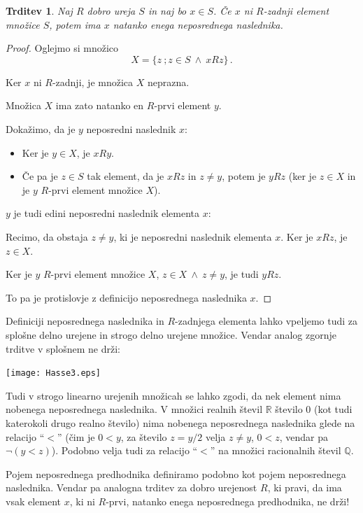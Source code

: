 \documentclass[11pt,paper=b5,footinclude,headinclude]{scrbook} %
\def\inn {{~\wedge~}}
\newtheorem*{trditev}{Trditev}
\begin{document}
\begin{trditev}
Naj $R$ dobro ureja $S$ in naj bo $x\in S$. Če $x$ ni $R$-zadnji element množice $S$, potem ima $x$ natanko enega neposrednega naslednika.
\end{trditev}

\begin{proof}
Oglejmo si množico
$$X = \{z~;z\in S\inn xRz\}\,.$$

Ker $x$ ni $R$-zadnji, je množica $X$ neprazna.

Množica $X$ ima zato natanko en $R$-prvi element $y$.

Dokažimo, da je $y$ neposredni naslednik $x$:
\begin{itemize}
  \item Ker je $y\in X$, je $xRy$.
  \item Če pa je $z\in S$ tak element, da je $xRz$ in $z\neq y$, potem je
$yRz$ (ker je $z\in X$ in je $y$ $R$-prvi element množice $X$).
\end{itemize}

$y$ je tudi edini neposredni naslednik elementa $x$:

Recimo, da obstaja $z\neq y$, ki je neposredni naslednik elementa $x$.
Ker je $xRz$, je $z\in X$.

Ker je $y$ $R$-prvi element množice $X$, $z\in X\inn z\neq y$,
je tudi $yRz$.

To pa je protislovje z definicijo neposrednega naslednika $x$.
\end{proof}

Definiciji neposrednega naslednika in $R$-zadnjega elementa lahko vpeljemo tudi za splošne delno urejene in strogo delno urejene množice. Vendar analog zgornje trditve v splošnem ne drži:

\begin{center}
\texttt{[image: Hasse3.eps]}
\end{center}

Tudi v strogo linearno urejenih množicah se lahko zgodi, da nek element nima nobenega neposrednega naslednika.
V množici realnih števil $\mathbb{R}$ število $0$ (kot tudi katerokoli drugo realno število) nima nobenega neposrednega naslednika glede na relacijo ``$<$'' (čim je $0<y$, za število $z = y/2$ velja $z\neq y$, $0<z$, vendar pa $\neg(y<z)$).
Podobno velja tudi za relacijo ``$<$'' na množici racionalnih števil $\mathbb{Q}$.

\medskip
Pojem neposrednega predhodnika definiramo podobno kot pojem neposrednega naslednika.
Vendar pa analogna trditev za dobro urejenost $R$, ki pravi, da ima vsak element $x$, ki ni $R$-prvi, natanko enega neposrednega predhodnika, ne drži!
\end{document}
